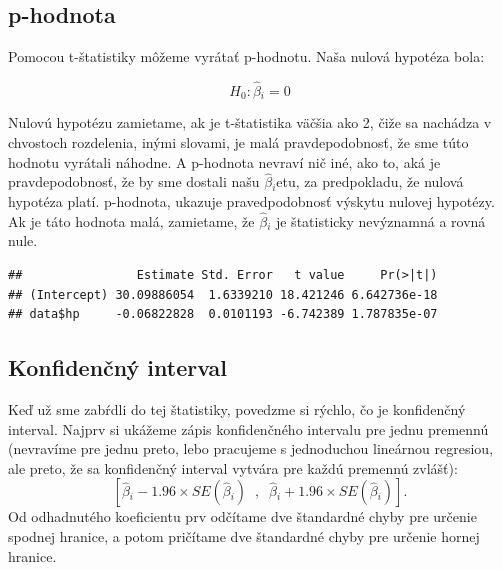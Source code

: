 \hypertarget{p-hodnota}{%
\subsection{p-hodnota}\label{p-hodnota}}

Pomocou t-štatistiky môžeme vyrátať p-hodnotu. Naša nulová hypotéza
bola:

\[H_0: \hat\beta{}_i = 0\]

Nulovú hypotézu zamietame, ak je t-štatistika väčšia ako 2, čiže sa
nachádza v chvostoch rozdelenia, inými slovami, je malá pravdepodobnosť,
že sme túto hodnotu vyrátali náhodne. A p-hodnota nevraví nič iné, ako
to, aká je pravdepodobnosť, že by sme dostali našu \(\hat\beta{}_i\)etu,
za predpokladu, že nulová hypotéza platí. p-hodnota, ukazuje
pravedpodobnosť výskytu nulovej hypotézy. Ak je táto hodnota malá,
zamietame, že \(\hat\beta{}_i\) je štatisticky nevýznamná a rovná nule.

\begin{Shaded}
\begin{Highlighting}[]

\OperatorTok{$}
\end{Highlighting}
\end{Shaded}

\begin{verbatim}
##                Estimate Std. Error   t value     Pr(>|t|)
## (Intercept) 30.09886054  1.6339210 18.421246 6.642736e-18
## data$hp     -0.06822828  0.0101193 -6.742389 1.787835e-07
\end{verbatim}

\hypertarget{konfidenux10dnuxfd-interval}{%
\subsection{Konfidenčný interval}\label{konfidenux10dnuxfd-interval}}

Keď už sme zabŕdli do tej štatistiky, povedzme si rýchlo, čo je
konfidenčný interval. Najprv si ukážeme zápis konfidenčného intervalu
pre jednu premennú (nevravíme pre jednu preto, lebo pracujeme s
jednoduchou lineárnou regresiou, ale preto, že sa konfidenčný interval
vytvára pre každú premennú zvlášť):
\[[\hat\beta{}_i - 1.96 × SE(\hat\beta{}_i)\;\;,\;\;\hat\beta{}_i + 1.96 × SE(\hat\beta{}_i)].\]
Od odhadnutého koeficientu prv odčítame dve štandardné chyby pre určenie
spodnej hranice, a potom pričítame dve štandardné chyby pre určenie
hornej hranice.

